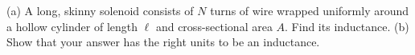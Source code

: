         (a) A long, skinny solenoid consists of $N$ turns of wire wrapped uniformly around a
        hollow cylinder of length $\ell$ and cross-sectional area $A$. Find its
        inductance.\answercheck\hwendpart
        (b) Show that your answer has the right units to be an inductance.
